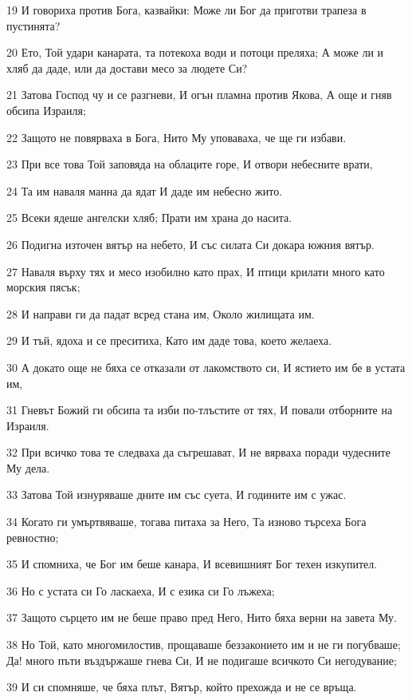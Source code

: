 \par 19 И говориха против Бога, казвайки: Може ли Бог да приготви трапеза в пустинята?
\par 20 Ето, Той удари канарата, та потекоха води и потоци преляха; А може ли и хляб да даде, или да достави месо за людете Си?
\par 21 Затова Господ чу и се разгневи, И огън пламна против Якова, А още и гняв обсипа Израиля;
\par 22 Защото не повярваха в Бога, Нито Му уповаваха, че ще ги избави.
\par 23 При все това Той заповяда на облаците горе, И отвори небесните врати,
\par 24 Та им наваля манна да ядат И даде им небесно жито.
\par 25 Всеки ядеше ангелски хляб; Прати им храна до насита.
\par 26 Подигна източен вятър на небето, И със силата Си докара южния вятър.
\par 27 Наваля върху тях и месо изобилно като прах, И птици крилати много като морския пясък;
\par 28 И направи ги да падат всред стана им, Около жилищата им.
\par 29 И тъй, ядоха и се преситиха, Като им даде това, което желаеха.
\par 30 А докато още не бяха се отказали от лакомството си, И ястието им бе в устата им,
\par 31 Гневът Божий ги обсипа та изби по-тлъстите от тях, И повали отборните на Израиля.
\par 32 При всичко това те следваха да съгрешават, И не вярваха поради чудесните Му дела.
\par 33 Затова Той изнуряваше дните им със суета, И годините им с ужас.
\par 34 Когато ги умъртвяваше, тогава питаха за Него, Та изново търсеха Бога ревностно;
\par 35 И спомниха, че Бог им беше канара, И всевишният Бог техен изкупител.
\par 36 Но с устата си Го ласкаеха, И с езика си Го лъжеха;
\par 37 Защото сърцето им не беше право пред Него, Нито бяха верни на завета Му.
\par 38 Но Той, като многомилостив, прощаваше беззаконието им и не ги погубваше; Да! много пъти въздържаше гнева Си, И не подигаше всичкото Си негодувание;
\par 39 И си спомняше, че бяха плът, Вятър, който прехожда и не се връща.
